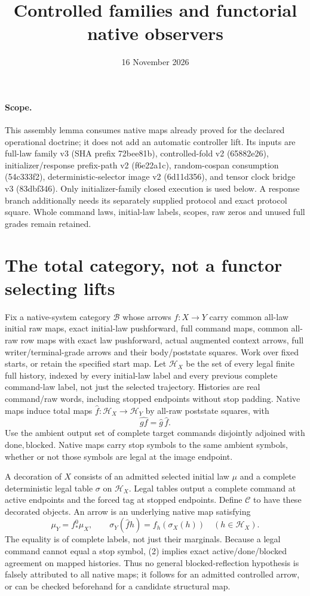 \documentclass[11pt]{article}
\title{Controlled families and functorial native observers}\date{16 November 2026}
\begin{document}
\maketitle
\paragraph{Scope.} This assembly lemma consumes native maps already proved for the declared operational doctrine; it does not add an automatic controller lift. Its inputs are full-law family v3 (SHA prefix 72bee81b), controlled-fold v2 (65882e26), initializer/response prefix-path v2 (f6e22a1c), random-cospan consumption (54c333f2), deterministic-selector image v2 (6d11d356), and tensor clock bridge v3 (83dbf346). Only initializer-family closed execution is used below. A response branch additionally needs its separately supplied protocol and exact protocol square. Whole command laws, initial-law labels, scopes, raw zeros and unused full grades remain retained.

\section{The total category, not a functor selecting lifts}
Fix a native-system category $\mathcal B$ whose arrows $f:X\to Y$ carry common all-law initial raw maps, exact initial-law pushforward, full command maps, common all-raw row maps with exact law pushforward, actual augmented context arrows, full writer/terminal-grade arrows and their body/poststate squares. Work over fixed starts, or retain the specified start map. Let $\mathcal H_X$ be the set of every legal finite full history, indexed by every initial-law label and every previous complete command-law label, not just the selected trajectory. Histories are real command/raw words, including stopped endpoints without stop padding. Native maps induce total maps $\widehat f:\mathcal H_X\to\mathcal H_Y$ by all-raw poststate squares, with
\[
\widehat{gf}=\widehat g\,\widehat f.                 \tag{1}
\]
Use the ambient output set of complete target commands disjointly adjoined with $\mathrm{done},\mathrm{blocked}$. Native maps carry stop symbols to the same ambient symbols, whether or not those symbols are legal at the image endpoint.

A decoration of $X$ consists of an admitted selected initial law $\mu$ and a complete deterministic legal table $\sigma$ on $\mathcal H_X$. Legal tables output a complete command at active endpoints and the forced tag at stopped endpoints. Define $\mathcal C$ to have these decorated objects. An arrow is an underlying native map satisfying
\[
 \mu_Y=f^0_*\mu_X,\qquad
 \sigma_Y(\widehat f h)=f_h(\sigma_X(h))\quad(h\in\mathcal H_X). \tag{2}
\]
The equality is of complete labels, not just their marginals. Because a legal command cannot equal a stop symbol, (2) implies exact active/done/blocked agreement on mapped histories. Thus no general blocked-reflection hypothesis is falsely attributed to all native maps; it follows for an admitted controlled arrow, or can be checked beforehand for a candidate structural map.
\end{document}
